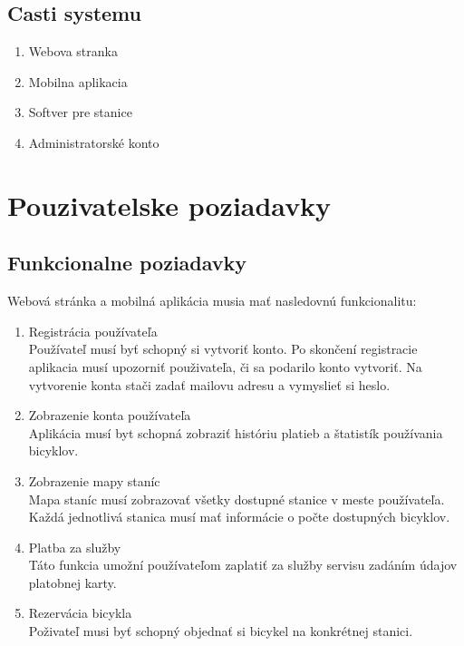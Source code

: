 \documentclass[12pt]{report}
\begin{document}
\subsection{Casti systemu}
\begin{enumerate}
    \item Webova stranka
    \item Mobilna aplikacia
    \item Softver pre stanice
    \item Administratorské konto
\end{enumerate}
 
\section{Pouzivatelske poziadavky}
\subsection{Funkcionalne poziadavky}

Webová stránka a mobilná aplikácia musia mať nasledovnú funkcionalitu:

\begin{enumerate}
    \item Registrácia používateľa \\
        Používateľ musí byť schopný si vytvoriť konto. Po skončení registracie 
        aplikacia musí upozorniť použivateľa, či sa podarilo konto vytvoriť.
        Na vytvorenie konta stači zadať mailovu adresu a vymyslieť si heslo.
        
    \item Zobrazenie konta používateľa \\
        Aplikácia musí byt schopná zobraziť históriu platieb a štatistík používania 
        bicyklov. 

    \item Zobrazenie mapy staníc \\
        Mapa staníc musí zobrazovať všetky dostupné stanice v meste používateľa. 
        Každá jednotlivá stanica musí mať informácie o počte dostupných bicyklov.
        
    \item Platba za služby \\
        Táto funkcia umožní používateľom zaplatiť za služby servisu zadáním údajov platobnej karty.
        
    \item Rezervácia bicykla \\
        Poživateľ musi byť schopný objednať si bicykel na konkrétnej stanici.

\end{enumerate}
\end{document}
